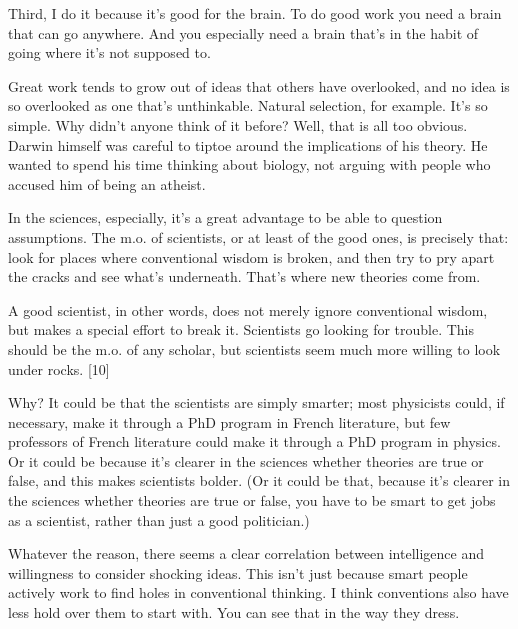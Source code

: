 Third, I do it because
                  it's good for the brain. To do good work you need a brain that
                  can go anywhere. And you especially need a brain that's in the
                  habit of going where it's not supposed to.

Great
                  work tends to grow out of ideas that others have overlooked,
                  and no idea is so overlooked as one that's unthinkable.
                  Natural selection, for example. It's so simple. Why didn't
                  anyone think of it before? Well, that is all too obvious.
                  Darwin himself was careful to tiptoe around the implications
                  of his theory. He wanted to spend his time thinking about
                  biology, not arguing with people who accused him of being an
                  atheist.

In the sciences, especially, it's a great
                  advantage to be able to question assumptions. The m.o. of
                  scientists, or at least of the good ones, is precisely that:
                  look for places where conventional wisdom is broken, and then
                  try to pry apart the cracks and see what's underneath. That's
                  where new theories come from.

A good scientist, in
                  other words, does not merely ignore conventional wisdom, but
                  makes a special effort to break it. Scientists go looking for
                  trouble. This should be the m.o. of any scholar, but
                  scientists seem much more willing to look under rocks. [10]

Why?
                  It could be that the scientists are simply smarter; most
                  physicists could, if necessary, make it through a PhD program
                  in French literature, but few professors of French literature
                  could make it through a PhD program in physics. Or it could be
                  because it's clearer in the sciences whether theories are true
                  or false, and this makes scientists bolder. (Or it could be
                  that, because it's clearer in the sciences whether theories
                  are true or false, you have to be smart to get jobs as a
                  scientist, rather than just a good politician.)

Whatever
                  the reason, there seems a clear correlation between
                  intelligence and willingness to consider shocking ideas. This
                  isn't just because smart people actively work to find holes in
                  conventional thinking. I think conventions also have less hold
                  over them to start with. You can see that in the way they
                  dress.

